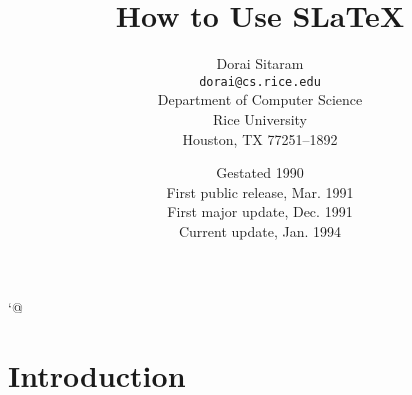 
\let\latexfootnote\footnote
\def\footnote{\unskip\latexfootnote\bgroup\let\dummy=}


\let\o\item


\renewenvironment{theindex}%
{\parindent0pt%
\let\item\@idxitem
\section*{Index}%
\ifx\multicols\undefined\else
\begin{multicols}{2}\fi}%
{\ifx\multicols\undefined\else
\end{multicols}\fi}

\catcode`@\atcatcodebeforepreamble

\begindoublequotes
\makeindex


\title{How to Use SLaTeX}

\author{Dorai Sitaram\\
{\tt dorai@cs.rice.edu}\\
Department of Computer Science\\
Rice University\\
Houston, TX 77251--1892}

\date{Gestated 1990\\
First public release, Mar. 1991\\
First major update, Dec. 1991\\
Current update, Jan. 1994}


\maketitle
\nolargefonts

\section{Introduction}

